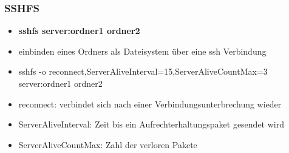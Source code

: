 \begin{frame}
\frametitle{SSHFS}
\begin{itemize}
\item \textbf{sshfs server:ordner1 ordner2}
\pause
\item einbinden eines Ordners als Dateisystem über eine ssh Verbindung
\pause
\item sshfs -o reconnect,ServerAliveInterval=15,ServerAliveCountMax=3 server:ordner1 ordner2
\pause
\item reconnect: verbindet sich nach einer Verbindungsunterbrechung wieder
\pause
\item ServerAliveInterval: Zeit bis ein Aufrechterhaltungspaket gesendet wird
\pause
\item ServerAliveCountMax: Zahl der verloren Pakete
\end{itemize}
\end{frame}